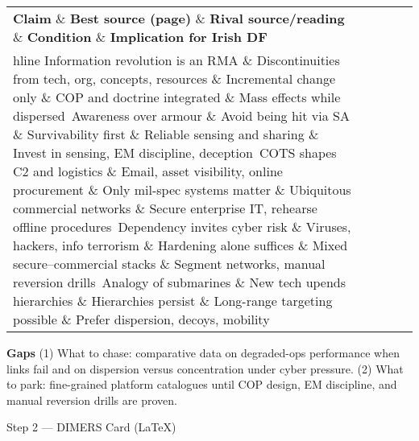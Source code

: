  
\begin{tabular}{p{3.2cm}p{4.2cm}p{3.6cm}p{3.2cm}p{4.2cm}}
	\textbf{Claim} \& \textbf{Best source (page)} \& \textbf{Rival source/reading} \& \textbf{Condition} \& \textbf{Implication for Irish DF}\\hline
	Information revolution is an RMA \& Discontinuities from tech, org, concepts, resources \& Incremental change only \& COP and doctrine integrated \& Mass effects while dispersed\
	Awareness over armour \& Avoid being hit via SA \& Survivability first \& Reliable sensing and sharing \& Invest in sensing, EM discipline, deception\
	COTS shapes C2 and logistics \& Email, asset visibility, online procurement \& Only mil-spec systems matter \& Ubiquitous commercial networks \& Secure enterprise IT, rehearse offline procedures\
	Dependency invites cyber risk \& Viruses, hackers, info terrorism \& Hardening alone suffices \& Mixed secure–commercial stacks \& Segment networks, manual reversion drills\
	Analogy of submarines \& New tech upends hierarchies \& Hierarchies persist \& Long-range targeting possible \& Prefer dispersion, decoys, mobility\
\end{tabular}

\textbf{Gaps}
(1) What to chase: comparative data on degraded-ops performance when links fail and on dispersion versus concentration under cyber pressure.
(2) What to park: fine-grained platform catalogues until COP design, EM discipline, and manual reversion drills are proven.

\parencite{KALDOR_2013}

Step 2 — DIMERS Card (LaTeX)


